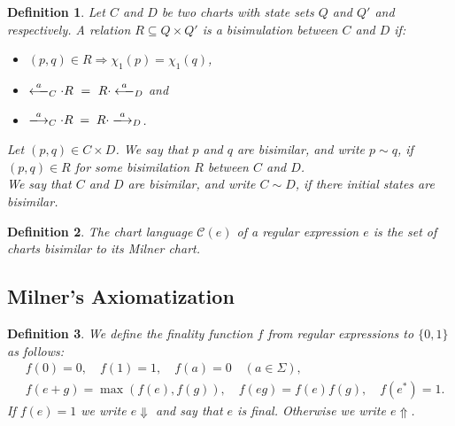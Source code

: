 \documentclass{article}
\newtheorem{definition}{Definition}[section]
\begin{document}
\begin{definition}
Let $C$ and $D$ be two charts with state sets $Q$ and $Q'$ and respectively. A relation $R\subseteq Q\times Q'$ is a \emph{bisimulation} between $C$ and $D$ if:
\begin{itemize}
    \item $(p,q)\in R \Rightarrow\chi_1(p)=\chi_1(q)$, 
    \item $\xlongleftarrow{a}_{C}\cdot R\ =\ R \cdot \xlongleftarrow{a}_{D}$ and
    \item $\xlongrightarrow{a}_{C} \cdot R\;=\;R \cdot \xlongrightarrow{a}_{D}$.
\end{itemize}

Let $(p,q)\in C\times D$. We say that $p$ and $q$ are \emph{bisimilar}, and write $p\sim q$, if $(p,q)\in R$ for some bisimilation $R$ between $C$  and $D$.\\

We say that $C$ and $D$ are \emph{bisimilar}, and write $C \sim D$, if there initial states are bisimilar.
\end{definition}

\begin{definition}
The \emph{chart language} $\mathcal{C}(e)$ of a regular expression $e$ is the set of charts bisimilar to its Milner chart. 
\end{definition}

\subsection{Milner's Axiomatization}


\begin{definition} We define the \emph{finality} function $f$ from regular
         expressions to $\{0,1\}$
         as follows:
\[
\begin{aligned}
&f(0)=0, \quad f(1)=1, \quad f(a)=0 \quad (a \in \Sigma), \\[0.3em]
&f(e+g)=\max(f(e),f(g)), \quad f(eg)=f(e)f(g), \quad f(e^*)=1 .
\end{aligned}
\]
If $f(e)=1$ we write $e\Downarrow$ and say that $e$ is \emph{final}. Otherwise we write $e\Uparrow$. 
    \end{definition}
\end{document}
